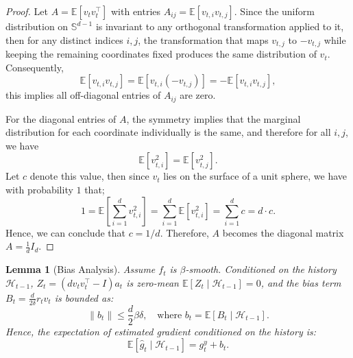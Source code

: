 \documentclass[journal,onecolumn]{IEEEtran}
\theoremstyle{plain}
\newtheorem{lemma}[theorem]{Lemma}
\theoremstyle{definition}
\theoremstyle{remark}
\begin{document}
{\begin{proof}
    Let $A= \mathbb{E}[v_{t}v_{t}^{\top}]$ with entries $A_{ij}=\mathbb{E}[v_{t,i}v_{t,j}]$. Since the uniform distribution on $\mathbb{S}^{d-1}$ is invariant to any orthogonal transformation applied to it, then for any distinct indices $i,j$, the transformation that maps $v_{t,j}$ to $-v_{t,j}$ while keeping the remaining coordinates fixed produces the same distribution of $v_{t}$. Consequently, 
    \begin{equation*}
        \mathbb{E}[v_{t,i}v_{t,j}] = \mathbb{E}[v_{t,i}(-v_{t,j})] = -\mathbb{E}[v_{t,i}v_{t,j}],
    \end{equation*} this implies all off-diagonal entries of $A_{ij}$ are zero.
    
    For the diagonal entries of $A$, the symmetry implies that the marginal distribution for each coordinate individually is the same, and therefore for all $i,j$, we have
    \begin{equation*}
        \mathbb{E}[v_{t,i}^{2}] = \mathbb{E}[v_{t,j}^{2}].
    \end{equation*}
    Let $c$ denote
    this value, then since $v_{t}$ lies on the surface of a unit sphere, we have with probability $1$ that; 
    \begin{equation*}
        1 = \mathbb{E}\left[\sum_{i=1}^{d}v_{t,i}^{2}\right] = \sum_{i=1}^{d}\mathbb{E}
        [v_{t,i}^{2}] = \sum_{i=1}^{d}c = d \cdot c.
    \end{equation*}
    Hence, we can conclude that $c=1/d$. Therefore, $A$ becomes the diagonal matrix $A = \frac{1}{d}I_{d}$.
\end{proof}

\begin{lemma}[Bias Analysis]
    \label{lem:bias} Assume $f_{t}$ is $\beta$-smooth. Conditioned on the
    history $\mathcal{H}_{t-1}$, $Z_{t}=(d v_tv_t^\top - I)a_t$ is zero-mean  $\mathbb{E}[Z_{t}\mid \mathcal{H}_{t-1}] = 0$, and the bias term $B_{t}=\frac{d}{2\delta}r_t v_t$
    is bounded as:
    \begin{equation*}
        \|b_{t}\| \le \frac{d}{2}
        \beta\delta, \quad \text{where }b_{t}= \mathbb{E}[B_{t}\mid \mathcal{H}_{t-1}
        ].
    \end{equation*}
    Hence, the expectation of estimated gradient conditioned on the history is:
    \begin{equation*}
        \mathbb{E}[\hat g_{t}\mid \mathcal{H}_{t-1}] = g_{t}^{y}+ b_{t}.
    \end{equation*}
\end{lemma}

}
\end{document}

